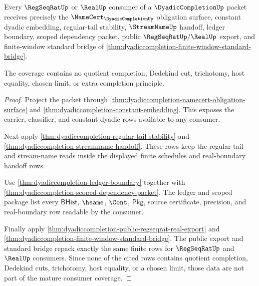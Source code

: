 \begin{theorem}
\label{thm:dyadiccompletion-mature-consumer-coverage}
Every $\RegSeqRatUp$ or $\RealUp$ consumer of a $\DyadicCompletionUp$ packet
receives precisely the $\NameCert_{\DyadicCompletionUp}$ obligation surface,
constant dyadic embedding, regular-tail stability, $\StreamNameUp$ handoff,
ledger boundary, scoped dependency packet, public $\RegSeqRatUp/\RealUp$
export, and finite-window standard bridge of
\autoref{thm:dyadiccompletion-finite-window-standard-bridge}.

The coverage contains no quotient completion, Dedekind cut, trichotomy, host
equality, chosen limit, or extra completion principle.
\end{theorem}
\begin{proof}
Project the packet through
\autoref{thm:dyadiccompletion-namecert-obligation-surface} and
\autoref{thm:dyadiccompletion-constant-embedding}. This exposes the carrier,
classifier, and constant dyadic rows available to any consumer.

Next apply \autoref{thm:dyadiccompletion-regular-tail-stability} and
\autoref{thm:dyadiccompletion-streamname-handoff}. These rows keep the regular
tail and stream-name reads inside the displayed finite schedules and
real-boundary handoff rows.

Use \autoref{thm:dyadiccompletion-ledger-boundary} together with
\autoref{thm:dyadiccompletion-scoped-dependency-packet}. The ledger and scoped
package list every $\mathsf{BHist}$, $\hsame$, $\Cont$, $\mathsf{Pkg}$, source
certificate, precision, and real-boundary row readable by the consumer.

Finally apply \autoref{thm:dyadiccompletion-public-regseqrat-real-export} and
\autoref{thm:dyadiccompletion-finite-window-standard-bridge}. The public export
and standard bridge repack exactly the same finite rows for $\RegSeqRatUp$ and
$\RealUp$ consumers. Since none of the cited rows contains quotient completion,
Dedekind cuts, trichotomy, host equality, or a chosen limit, those data are not
part of the mature consumer coverage.
\end{proof}

